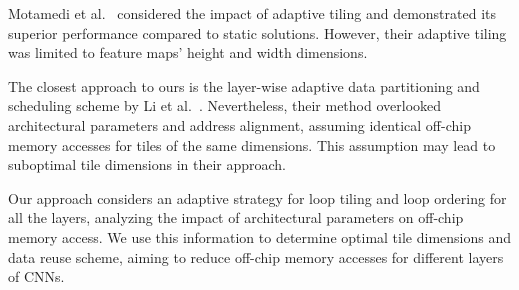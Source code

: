 Motamedi et al.~\cite{7428073} considered the impact of adaptive tiling and demonstrated its superior performance compared to static solutions. However, their adaptive tiling was limited to feature maps' height and width dimensions.

The closest approach to ours is the layer-wise adaptive data partitioning and scheduling scheme by Li et al.~\cite{Li2018SmartShuttleOO}. Nevertheless, their method overlooked architectural parameters and address alignment, assuming identical off-chip memory accesses for tiles of the same dimensions. This assumption may lead to suboptimal tile dimensions in their approach.

Our approach considers an adaptive strategy for loop tiling and loop ordering for all the layers, analyzing the impact of architectural parameters on off-chip memory access. We use this information to determine optimal tile dimensions and data reuse scheme, aiming to reduce off-chip memory accesses for different layers of CNNs.

